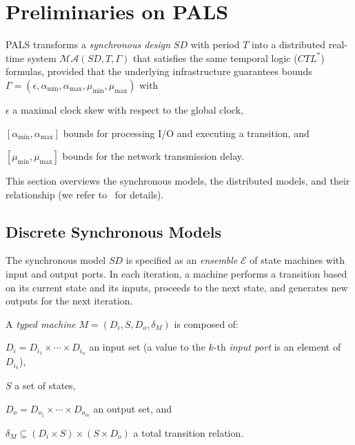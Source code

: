 
\section{Preliminaries on PALS}
\label{sec:pals}

PALS transforms 
 a \emph{synchronous design} $\mathit{SD}$ with  period $T$
into a %
distributed real-time system $\mathcal{MA}(\mathit{SD}, T, \Gamma)$
that satisfies the same temporal logic ($CTL^*$) formulas,
provided that the underlying 
infrastructure guarantees bounds %
$\Gamma = (\epsilon, \alpha_{\min}, \alpha_{\max}, \mu_{\min}, \mu_{\max})$
with
%
\begin{inparaenum}[(i)]
	\item $\epsilon$ a maximal clock skew  with respect to the global clock,
	\item $[\alpha_{\min},\alpha_{\max}]$  bounds for processing
          I/O and 
	executing a transition,   %
	and
	\item $[\mu_{\min}, \mu_{\max}]$ bounds  for the network transmission delay.
\end{inparaenum}
This section overviews the synchronous models, %
the distributed  models, %
 and their relationship %
(we refer to~\cite{mr-pals-journal,pals-tcs} for details).


\subsection{Discrete Synchronous Models}

The synchronous model $\mathit{SD}$ is specified  as 
an \emph{ensemble}
$\mathcal{E}$  of %
state machines with input and output ports.
In  each iteration, a machine performs a transition
based on its current state and its inputs, %
 proceeds to the next state, and generates new outputs for the next iteration.


\begin{definition}
A  \emph{typed machine}  $M = (D_i,S,D_o,\delta_M)$
is composed of:
%
\begin{inparaenum}[(i)]
	\item $D_i = D_{i_1} \times \cdots \times D_{i_n}$ an input set 
	(a value to the $k$-th \emph{input port}  is an element of  $D_{i_k}$), 
	\item $S$ a set of states, 
	\item $D_o =D_{o_1} \times \cdots \times D_{o_m}$ an output set,
        and 
	\item $\delta_M \subseteq (D_i \times S) \times (S \times D_o)$ a total
	transition relation.
\end{inparaenum}  
\end{definition}




